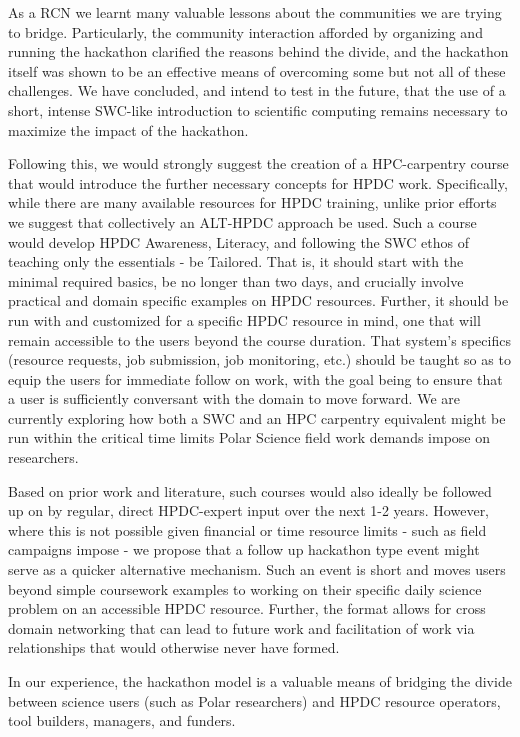 \documentclass[conference]{IEEEtran}
\begin{document}
As a RCN we learnt many valuable lessons about the communities we are trying to bridge. Particularly, the community interaction afforded by organizing and running the hackathon clarified the reasons behind the divide, and the hackathon itself was shown to be an effective means of overcoming some but not all of these challenges.  We have concluded, and intend to test in the future, that the use of a short, intense SWC-like introduction to scientific computing remains necessary to maximize the impact of the hackathon.  

Following this, we would strongly suggest the creation of a HPC-carpentry course that would introduce the further necessary concepts for HPDC work. Specifically, while there are many available resources for HPDC training, unlike prior efforts we suggest that collectively an ALT-HPDC approach be used.  Such a course would develop HPDC Awareness, Literacy, and following the SWC ethos of teaching only the essentials - be Tailored. That is, it should start with the minimal required basics, be no longer than two days, and crucially involve practical and domain specific examples on HPDC resources. Further, it should be run with and customized for a specific HPDC resource in mind, one that will remain accessible to the users beyond the course duration. That system's specifics (resource requests, job submission, job monitoring, etc.) should be taught so as to equip the users for immediate follow on work, with the goal being to ensure that a user is sufficiently conversant with the domain to move forward. We are currently exploring how both a SWC and an HPC carpentry equivalent might be run within the critical time limits Polar Science field work demands impose on researchers.  

Based on prior work and literature, such courses would also ideally be followed up on by regular, direct HPDC-expert input over the next 1-2 years. However, where this is not possible given financial or time resource limits - such as field campaigns impose - we propose that a follow up hackathon type event might serve as a quicker alternative mechanism. Such an event is short and moves users beyond simple coursework examples to working on their specific daily science problem on an accessible HPDC resource. Further, the format allows for cross domain networking that can lead to future work and facilitation of work via relationships that would otherwise never have formed.

In our experience, the hackathon model is a valuable means of bridging the divide between science users (such as Polar researchers) and HPDC resource operators, tool builders, managers, and funders.  
\end{document}
